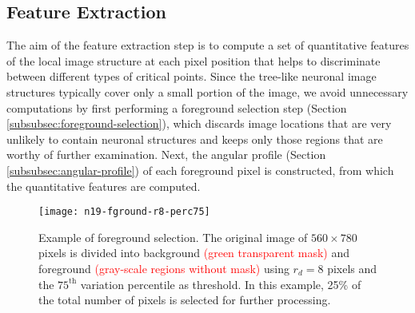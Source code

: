 \documentclass[twocolumn,natbib]{svjour3}
\newcommand{\marked}[1]{\textcolor{red}{#1}}
\begin{document}
\subsection{Feature Extraction}
\label{subsec:feature-extraction}
The aim of the feature extraction step is to compute a set of quantitative features of the local image structure at each pixel position that helps to discriminate between different types of critical points. Since the tree-like neuronal image structures typically cover only a small portion of the image, we avoid unnecessary computations by first performing a foreground selection step (Section \ref{subsubsec:foreground-selection}), which discards image locations that are very unlikely to contain neuronal structures and keeps only those regions that are worthy of further examination. Next, the angular profile (Section \ref{subsubsec:angular-profile}) of each foreground pixel is constructed, from which the quantitative features are computed.

\begin{figure}[!t]
\centering
\texttt{[image: n19-fground-r8-perc75]} %
\caption{Example of foreground selection. The original image of $560\times780$ pixels is divided into background \marked{(green transparent mask)} and foreground \marked{(gray-scale regions without mask)} using $r_{d}=8$ pixels and the $75^\textrm{th}$ variation percentile as threshold. In this example, 25\% of the total number of pixels is selected for further processing.}
\label{fig:foreground-selection}
\end{figure}
\end{document}
